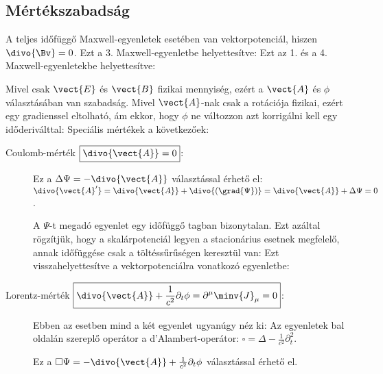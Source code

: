   \subsection{Mértékszabadság}\label{ss:04-mertekszabadsag}
  
   A teljes időfüggő Maxwell-egyenletek esetében van vektorpotenciál, hiszen $\divo{\Bv}=0$.
   Ezt a 3. Maxwell-egyenletbe helyettesítve:
   Ezt az 1. és a 4. Maxwell-egyenletekbe helyettesítve:
   
   Mivel csak $\vect{E}$ és $\vect{B}$ fizikai mennyiség, ezért a $\vect{A}$ és $\phi$ választásában van szabadság.
   Mivel $\vect{A}$-nak csak a rotációja fizikai, ezért egy gradienssel eltolható, ám ekkor, hogy $\phi$ ne változzon azt korrigálni kell egy időderiválttal:
   Speciális mértékek a következőek:
   \begin{description}
    \item[Coulomb-mérték $\boxed{\divo{\vect{A}}=0}$:] Ez a $\Delta\Psi=-\divo{\vect{A}}$ választással érhető el: $\divo{\vect{A}'}=\divo{\vect{A}}+\divo{(\grad{\Psi})}=\divo{\vect{A}}+\Delta{\Psi}=0$. 
    
    A $\Psi$-t megadó egyenlet egy időfüggő tagban bizonytalan.
   Ezt azáltal rögzítjük, hogy a skalárpotenciál legyen a stacionárius esetnek megfelelő, annak időfüggése csak a töltéssűrűségen keresztül van:
    Ezt visszahelyettesítve a vektorpotenciálra vonatkozó egyenletbe:
    \item[Lorentz-mérték $\boxed{\divo{\vect{A}}+\frac{1}{c^2}\partial_t\phi=\partial^\mu\minv{J}_\mu=0}$:] Ebben az esetben mind a két egyenlet ugyanúgy néz ki:
    Az egyenletek bal oldalán szereplő operátor a d'Alambert-operátor: $\square=\Delta-\frac{1}{c^2}\partial_t^2$.
    
    Ez a $\square\Psi=-\divo{\vect{A}}+\frac{1}{c^2}\partial_t\phi$ választással érhető el.
   \end{description} 
   
